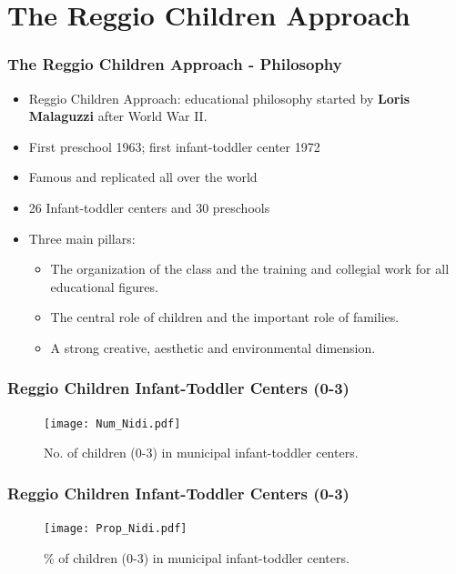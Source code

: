 \documentclass[xcolor=table]{beamer}
\begin{document}
\section{The Reggio Children Approach}\label{sec:RCH}
\begin{frame}
\frametitle{The Reggio Children Approach - Philosophy}\label{frame:philosphy}
\begin{itemize}
	\item Reggio Children Approach: educational philosophy started by \textbf{Loris Malaguzzi} after World War II.
	\item First preschool 1963; first infant-toddler center 1972
	\item Famous and replicated all over the world \hyperlink{fig:World}{}
	\item 26 Infant-toddler centers and 30 preschools
	\vspace{2ex}
	\item Three main pillars:
		\begin{itemize}
	\item The organization of the class and the training and collegial work for all educational figures.
	\item The central role of children and the important role of families.
	\item A strong creative, aesthetic and environmental dimension.
		\end{itemize} 
\end{itemize} 
\end{frame} 
\begin{frame}
\frametitle{Reggio Children Infant-Toddler Centers (0-3)}
\begin{center}
\begin{figure}
\texttt{[image: Num\_Nidi.pdf]}
\caption{No. of children (0-3) in municipal infant-toddler centers.}
\end{figure}
\end{center}
\end{frame}
\begin{frame}
\frametitle{Reggio Children Infant-Toddler Centers (0-3)}
\begin{center}
\begin{figure}
\texttt{[image: Prop\_Nidi.pdf]}
\caption{\% of children (0-3) in municipal infant-toddler centers.}
\end{figure}
\end{center}
\end{frame} 
\end{document}
